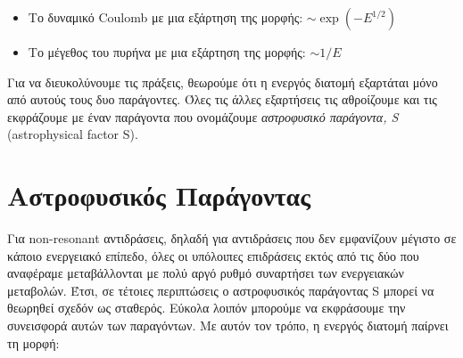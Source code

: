 \begin{itemize}
\item Το δυναμικό Coulomb με μια εξάρτηση της μορφής: $\sim \exp (-E^{1/2}) $
\item Το μέγεθος του πυρήνα με μια εξάρτηση της μορφής: $\sim 1/E$
\end{itemize}
Για να διευκολύνουμε τις πράξεις, θεωρούμε ότι η ενεργός διατομή εξαρτάται μόνο από αυτούς τους δυο παράγοντες. Όλες τις άλλες εξαρτήσεις τις αθροίζουμε και τις εκφράζουμε με έναν παράγοντα που ονομάζουμε \textit{αστροφυσικό παράγοντα, S} (astrophysical factor S).
\section{Aστροφυσικός Παράγοντας}
Για non-resonant αντιδράσεις, δηλαδή για αντιδράσεις που δεν εμφανίζουν μέγιστο σε κάποιο ενεργειακό επίπεδο, όλες οι υπόλοιπες επιδράσεις εκτός από τις δύο που αναφέραμε μεταβάλλονται με πολύ αργό ρυθμό συναρτήσει των ενεργειακών μεταβολών. Έτσι, σε τέτοιες περιπτώσεις ο αστροφυσικός παράγοντας S μπορεί να θεωρηθεί σχεδόν ως σταθερός. Εύκολα λοιπόν μπορούμε να εκφράσουμε την συνεισφορά αυτών των παραγόντων. Με αυτόν τον τρόπο, η ενεργός διατομή παίρνει τη μορφή:

